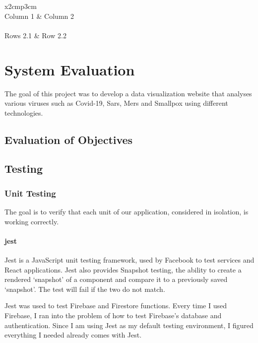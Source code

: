 \begin{table}[ht]
  \centering
  \begin{tabular}{x{2cm}p{3cm}}
    \toprule \\
    Column 1 & Column 2 \\
    \midrule \\
    Rows 2.1 & Row 2.2 \\
    \bottomrule
  \end{tabular}
  \caption{A table.}
  \label{table:mytable}
\end{table}

\chapter{System Evaluation}
The goal of this project was to develop a data visualization website that analyses various viruses such as Covid-19, Sars, Mers and Smallpox using different technologies. 

\section{Evaluation of Objectives}

\section{Testing}

\subsection{Unit Testing}
The goal is to verify that each unit of our application, considered in isolation, is working correctly.

\subsubsection{jest}
Jest is a JavaScript unit testing framework, used by Facebook to test services and React applications.
Jest also provides Snapshot testing, the ability to create a rendered ‘snapshot’ of a component and compare it to a previously saved ‘snapshot’. The test will fail if the two do not match.

Jest was used to test Firebase and Firestore functions.
Every time I used Firebase, I ran into the problem of how to test Firebase's database and authentication. Since I am using Jest as my default testing environment, I figured everything I needed already comes with Jest.

